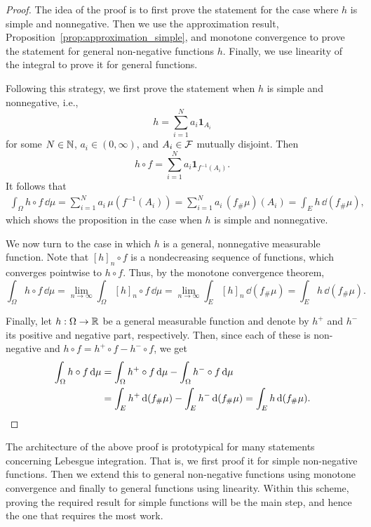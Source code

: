 \begin{proof}
The idea of the proof is to first prove the statement for the case where $h$ is simple and nonnegative. Then we use the approximation result, Proposition~\ref{prop:approximation_simple}, and monotone convergence to prove the statement for general non-negative functions $h$. Finally, we use linearity of the integral to prove it for general functions.

Following this strategy, we first prove the statement when $h$ is simple and nonnegative, i.e.,
\[
h = \sum_{i=1}^N a_i \mathbf{1}_{A_i}
\]
for some $N \in \mathbb N$, $a_i \in (0,\infty)$, and $A_i \in \mathcal F$ mutually disjoint. Then 
\[
	h \circ f = \sum_{i=1}^N a_i  \mathbf{1}_{f^{-1}(A_i)}.
\]
It follows that
\[
\begin{split}
\int_\Omega h \circ f\, \dd \mu 
= \sum_{i=1}^N a_i \, \mu(f^{-1}(A_i)) 
= \sum_{i=1}^N a_i \, (f_\# \mu)(A_i) 
= \int_E h \, \dd (f_\# \mu),
\end{split}
\]
which shows the proposition in the case when $h$ is simple and nonnegative. 

We now turn to the case in which $h$ is a general, nonnegative measurable function. Note that $[h]_n \circ f$ is a nondecreasing sequence of functions, which converges pointwise to $h \circ f$. Thus, by the monotone convergence theorem,
\[
\int_\Omega h \circ f\, \dd \mu 
= \lim_{n \to \infty} \int_\Omega [h]_n \circ f\, \dd \mu 
= \lim_{n \to \infty} \int_E [h]_n \, \dd (f_\# \mu) 
= \int_E h \, \dd (f_\# \mu).
\]

Finally, let $h: \Omega \to \mathbb R$ be a general measurable function and denote by $h^+$ and $h^-$ its positive and negative part, respectively. Then, since each of these is non-negative and $h \circ f = h^+ \circ f - h^- \circ f$, we get
\begin{align*}
	\int_\Omega h \circ f\, \mathrm{d} \mu &= \int_\Omega h^+ \circ f\, \mathrm{d} \mu - \int_\Omega h^- \circ f\, \mathrm{d} \mu\\
	&= \int_E h^+ \, \mathrm{d} (f_\# \mu) - \int_E h^- \, \mathrm{d} (f_\# \mu) = \int_E h \, \mathrm{d} (f_\# \mu).\qedhere
\end{align*}
\end{proof}

\begin{remark}
The architecture of the above proof is prototypical for many statements concerning Lebesgue integration. That is, we first proof it for simple non-negative functions. Then we extend this to general non-negative functions using monotone convergence and finally to general functions using linearity. Within this scheme, proving the required result for simple functions will be the main step, and hence the one that requires the most work.
\end{remark}

